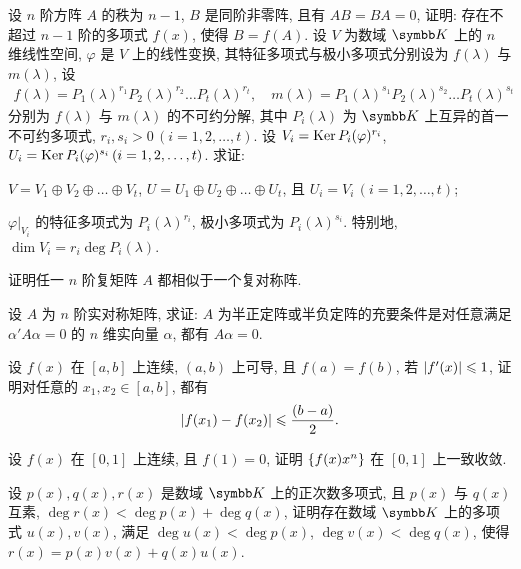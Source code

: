\documentclass{ctexart}
\begin{document}
\begin{exercise}[series=exer]
    \item 设 $ n $ 阶方阵 $ A $ 的秩为 $ n-1 $, $ B $ 是同阶非零阵, 且有 $ AB = BA = 0 $, 证明: 存在不超过 $ n-1 $ 阶的多项式 $ f(x) $, 使得 $ B = f(A) $.
    \sitem 设 $ V $ 为数域 $ \K $ 上的 $ n $ 维线性空间, $ \varphi $ 是 $ V $ 上的线性变换, 其特征多项式与极小多项式分别设为 $ f(\lambda) $ 与 $ m(\lambda) $, 设
    \begin{align*}
        f(\lambda) = P_{1}(\lambda)^{r_{1}}P_{2}(\lambda)^{r_{2}}\dots P_{t}(\lambda)^{r_{t}}, \quad m(\lambda) = P_{1}(\lambda)^{s_{1}}P_{2}(\lambda)^{s_{2}}\dots P_{t}(\lambda)^{s_{t}}
    \end{align*}
    分别为 $ f(\lambda) $ 与 $ m(\lambda) $ 的不可约分解, 其中 $ P_{i}(\lambda) $ 为 $ \K $ 上互异的首一不可约多项式, $ r_{i}, s_{i} > 0\, (i = 1, 2, \dots, t) $. 设 $ V_{i} = \operatorname{Ker} P_{i}(\varphi)^{r_{i}} $, $ U_{i} = \operatorname{Ker} P_{i}(\varphi)^{s_{i}}\,(i = 1, 2, \dots, t) $. 求证:
    \begin{exercise}
        \item $ V = V_{1} \oplus V_{2} \oplus \dots \oplus V_{t} $, $ U = U_{1} \oplus U_{2} \oplus \dots \oplus U_{t} $, 且 $ U_{i} = V_{i}\,(i = 1, 2, \dots, t) $;
        \item $ \varphi|_{V_{i}} $ 的特征多项式为 $ P_{i}(\lambda)^{r_{i}} $, 极小多项式为 $ P_{i}(\lambda)^{s_{i}} $. 特别地, $ \dim V_{i} = r_{i}\deg P_{i}(\lambda) $. 
    \end{exercise}
    \item 证明任一 $ n $ 阶复矩阵 $ A $ 都相似于一个复对称阵.
    \item 设 $ A $ 为 $ n $ 阶实对称矩阵, 求证: $ A $ 为半正定阵或半负定阵的充要条件是对任意满足 $ \alpha' A\alpha = 0 $ 的 $ n $ 维实向量 $ \alpha $, 都有 $ A\alpha = 0 $.
    \item 设 $ f(x) $ 在 $ [a, b] $ 上连续, $ (a, b) $ 上可导, 且 $ f(a) = f(b) $, 若 $ \abs{f'(x)} \leqslant 1 $, 证明对任意的 $ x_{1}, x_{2} \in [a, b] $, 都有
    \begin{align*}
        \abs{f(x_{1}) - f(x_{2})} \leqslant \frac{(b - a)}{2}.
    \end{align*}
    \item 设 $ f(x) $ 在 $ [0, 1] $ 上连续, 且 $ f(1) = 0 $, 证明 $ \qty{f(x)x^{n}} $ 在 $ [0, 1] $ 上一致收敛.
    \item 设 $ p(x), q(x), r(x) $ 是数域 $ \K $ 上的正次数多项式, 且 $ p(x) $ 与 $ q(x) $ 互素, $ \deg r(x) < \deg p(x) + \deg q(x) $, 证明存在数域 $ \K $ 上的多项式 $ u(x), v(x) $, 满足 $ \deg u(x) < \deg p(x) $, $ \deg v(x) < \deg q(x) $, 使得 $ r(x) = p(x)v(x) + q(x)u(x) $.

\end{exercise}
\end{document}
